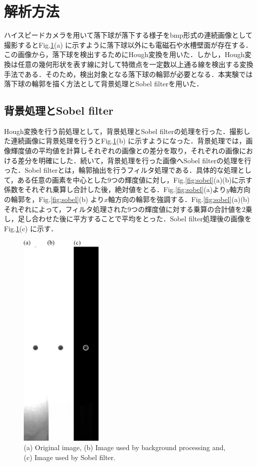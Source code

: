 \section{解析方法}
ハイスピードカメラを用いて落下球が落下する様子をbmp形式の連続画像として撮影するとFig.\ref{fig:expPhoto}(a) に示すように落下球以外にも電磁石や水槽壁面が存在する．この画像から，落下球を検出するためにHough変換を用いた．しかし，Hough変換は任意の幾何形状を表す線に対して特徴点を一定数以上通る線を検出する変換手法である．そのため，検出対象となる落下球の輪郭が必要となる．本実験では落下球の輪郭を描く方法として背景処理とSobel filterを用いた．
\subsection{背景処理とSobel filter}
Hough変換を行う前処理として，背景処理とSobel filterの処理を行った．撮影した連続画像に背景処理を行うとFig.\ref{fig:expPhoto}(b) に示すようになった．背景処理では，画像輝度値の平均値を計算しそれぞれの画像との差分を取り，それぞれの画像における差分を明確にした．続いて，背景処理を行った画像へSobel filterの処理を行った．Sobel filterとは，輪郭抽出を行うフィルタ処理である．具体的な処理として，ある任意の画素を中心とした9つの輝度値に対し，Fig.\ref{fig:sobel}(a)(b)に示す係数をそれぞれ乗算し合計した後，絶対値をとる．Fig.\ref{fig:sobel}(a)より$y$軸方向の輪郭を，Fig.\ref{fig:sobel}(b) より$x$軸方向の輪郭を強調する．Fig.\ref{fig:sobel}(a)(b)それぞれによって，フィルタ処理された9つの輝度値に対する乗算の合計値を2乗し，足し合わせた後に平方することで平均をとった．Sobel filter処理後の画像をFig.\ref{fig:expPhoto}(c) に示す．

\begin{figure}[h]
    \centering
    \includegraphics[width=4.0cm,clip]{3-Analysis/exp-img.png}
    \caption{(a) Original image, (b) Image used by background processing and, (c) Image used by Sobel filter.}
    \label{fig:expPhoto}
\end{figure}


